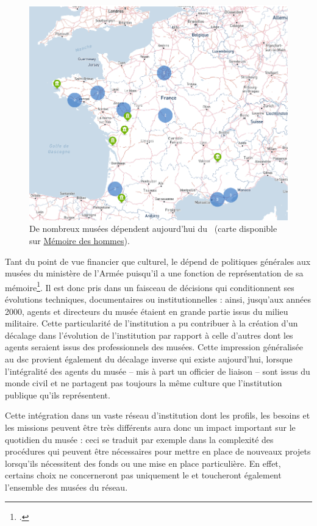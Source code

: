 \begin{figure}[htbp]
	\centering
	\includegraphics[width=\linewidth]{img/CART_musees_armee}
	\caption[Cartographie du réseau des musées du \minarm]{De nombreux musées dépendent aujourd'hui du \minarm~(carte disponible sur \href{https://www.memoiredeshommes.sga.defense.gouv.fr/musees-collections-et-mecenat/musees-et-monuments}{Mémoire des hommes}).}
	\label{fig:cart_musees}
\end{figure}


Tant du point de vue financier que culturel, le \mae dépend de politiques générales aux musées du ministère de l'Armée puisqu'il a une fonction de représentation de sa mémoire\footcite{museedelairetdelespaceProjetScientifiqueCulturel2020}. Il est donc pris dans un faisceau de décisions qui conditionnent ses évolutions techniques, documentaires ou institutionnelles : ainsi, jusqu'aux années 2000, agents et directeurs du musée étaient en grande partie issus du milieu militaire. Cette particularité de l'institution a pu contribuer à la création d'un décalage dans l'évolution de l'institution  par rapport à celle d'autres dont les agents seraient issus des professionnels des musées. Cette impression généralisée au \ac{dsc} provient également du décalage inverse qui existe aujourd'hui, lorsque l'intégralité des agents du musée -- mis à part un officier de liaison -- sont issus du monde civil et ne partagent pas toujours la même culture que l'institution publique qu'ils représentent.

Cette intégration dans un vaste réseau d'institution dont les profils, les besoins et les missions peuvent être très différents aura donc un impact important sur le quotidien du musée : ceci se traduit par exemple dans la complexité des procédures qui peuvent être nécessaires pour mettre en place de nouveaux projets lorsqu'ils nécessitent des fonds ou une mise en place particulière. En effet, certains choix ne concerneront pas uniquement le \mae et toucheront également l'ensemble des musées du réseau.
